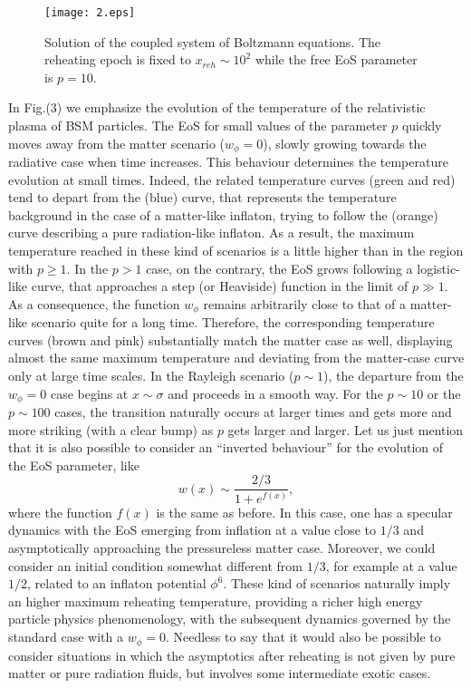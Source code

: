 \documentclass[%
aps,prd,nofootinbib,showkeys,a4paper,10pt
]{revtex4-2}
\begin{document}
\begin{figure}%
\centering
\hspace*{-1cm}
\texttt{[image: 2.eps]}
\caption{Solution of the coupled system of Boltzmann equations. 
The reheating epoch is fixed to $x_{reh}\sim 10^2$ while the free EoS parameter is $p=10$.}
\label{fig: 2}
\end{figure}



In Fig.(3) we emphasize the evolution of the temperature of the relativistic plasma of BSM particles.
The EoS for small values of the parameter $p$ quickly moves away from the matter scenario ($w_{\phi}=0$), slowly growing towards the radiative case when time increases. 
This behaviour determines the temperature evolution at small times.  Indeed, the related temperature curves (green and red) tend to depart from the (blue) curve, 
that represents the temperature background
in the case of a matter-like inflaton, trying to follow the (orange) curve describing a pure radiation-like inflaton.
As a result, the maximum temperature reached in these kind of scenarios is a little higher than in the region with $p\geq 1$.
In the $p>1$ case, on the contrary, the EoS grows following a logistic-like curve, that approaches a step (or Heaviside) function in the limit of $p\gg 1$. 
As a consequence, the function $w_{\phi}$ remains arbitrarily close to that of a matter-like scenario quite for a long time. 
Therefore, the corresponding temperature curves (brown and pink) substantially match the matter case as well, 
displaying almost the same maximum temperature and deviating from the matter-case curve only at large time scales.
In the Rayleigh scenario ($p\sim 1$), the departure from the $w_{\phi}=0$ case begins at $x\sim\sigma$ and proceeds in a smooth way.  
For the $p\sim 10$ or the $p\sim 100$ cases, the transition naturally occurs at larger times and gets more and more striking (with a clear bump) as $p$ gets larger and larger.
Let us just mention that it is also possible to consider an ``inverted behaviour'' for the evolution of the EoS parameter, like 
\begin{equation}\label{eqn: inverted}
w(x)\sim\frac{2/3}{1+e^{f(x)}}  ,
\end{equation}
where the function $f(x)$ is the same as before.
In this case, one has a specular dynamics with the EoS emerging from inflation at a value close to $1/3$
and asymptotically approaching the pressureless matter case.  Moreover, we could consider an initial condition somewhat different from $1/3$, 
for example at a value $1/2$, related to an inflaton potential $\phi^6$. These kind of scenarios naturally imply an higher maximum reheating temperature, 
providing a richer high energy particle physics phenomenology, with the subsequent dynamics governed by the standard case with a $w_{\phi}=0$.  
Needless to say that it would also be possible to consider
situations in which the asymptotics after reheating is not given by  pure  matter or pure radiation fluids, but involves some intermediate exotic cases. 
\end{document}
